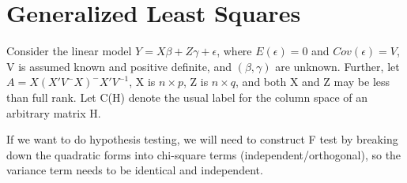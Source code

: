 
 \section{Generalized Least Squares}
 
Consider the linear model $Y = X\beta + Z\gamma + \epsilon$, where $E(\epsilon) = 0$ and $Cov(\epsilon) = V$, V is assumed known and positive definite, and $(\beta, \gamma)$ are unknown. Further, let $A =X(X'V^-X)^-X'V^{-1}$, X is $n \times p$, Z is $n \times q$, and both X and Z may be less than full rank. Let C(H) denote the usual label for the column space of an arbitrary matrix H.

If we want to do hypothesis testing, we will need to construct F test by breaking down the quadratic forms into chi-square terms (independent/orthogonal), so the variance term needs to be identical and independent.

